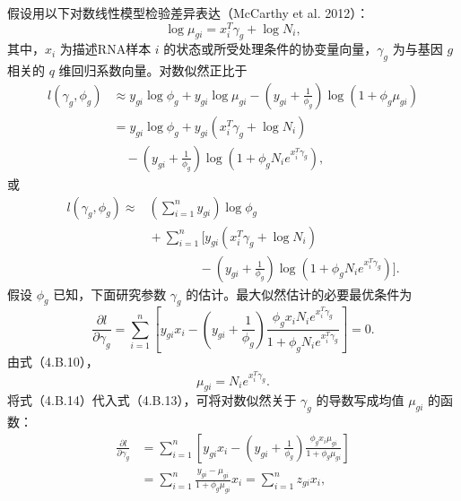 假设用以下对数线性模型检验差异表达（McCarthy et al. 2012）：
\begin{equation}
\log\mu_{gi}=x_i^T\gamma_g+\log N_i,\tag{4.B.10}
\end{equation}
其中，$x_i$ 为描述RNA样本 $i$ 的状态或所受处理条件的协变量向量，$\gamma_g$ 为与基因 $g$ 相关的 $q$ 维回归系数向量。对数似然正比于
\begin{equation}
\begin{aligned}
l(\gamma_g,\phi_g)
&\approx y_{gi}\log\phi_g+y_{gi}\log\mu_{gi}
 -\left(y_{gi}+\frac1{\phi_g}\right)\log(1+\phi_g\mu_{gi})\\
&=y_{gi}\log\phi_g+y_{gi}(x_i^T\gamma_g+\log N_i)\\
&\quad{}-\left(y_{gi}+\frac1{\phi_g}\right)
 \log(1+\phi_gN_ie^{x_i^T\gamma_g}),
\end{aligned}\tag{4.B.11}
\end{equation}
或
\begin{equation}
\begin{aligned}
l(\gamma_g,\phi_g)\approx{}&\left(\sum_{i=1}^{n}y_{gi}\right)\log\phi_g\\
&{}+\sum_{i=1}^{n}\biggl[y_{gi}(x_i^T\gamma_g+\log N_i)\\
&\hspace{4em}{}-\left(y_{gi}+\frac1{\phi_g}\right)
 \log(1+\phi_gN_ie^{x_i^T\gamma_g})\biggr].
\end{aligned}\tag{4.B.12}
\end{equation}
假设 $\phi_g$ 已知，下面研究参数 $\gamma_g$ 的估计。最大似然估计的必要最优条件为
\begin{equation}
\frac{\partial l}{\partial\gamma_g}=
\sum_{i=1}^{n}\left[y_{gi}x_i-
\left(y_{gi}+\frac1{\phi_g}\right)
\frac{\phi_gx_iN_ie^{x_i^T\gamma_g}}{1+\phi_gN_ie^{x_i^T\gamma_g}}\right]=0.\tag{4.B.13}
\end{equation}
由式（4.B.10），
\begin{equation}
\mu_{gi}=N_ie^{x_i^T\gamma_g}.\tag{4.B.14}
\end{equation}
将式（4.B.14）代入式（4.B.13），可将对数似然关于 $\gamma_g$ 的导数写成均值 $\mu_{gi}$ 的函数：
\begin{equation}
\begin{aligned}
\frac{\partial l}{\partial\gamma_g}
&=\sum_{i=1}^{n}\left[y_{gi}x_i-
 \left(y_{gi}+\frac1{\phi_g}\right)\frac{\phi_gx_i\mu_{gi}}{1+\phi_g\mu_{gi}}\right]\\
&=\sum_{i=1}^{n}\frac{y_{gi}-\mu_{gi}}{1+\phi_g\mu_{gi}}x_i
=\sum_{i=1}^{n}z_{gi}x_i,
\end{aligned}\tag{4.B.15}
\end{equation}
